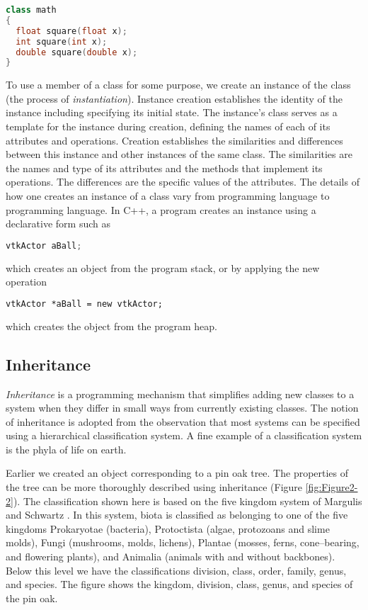 \begin{lstlisting}[language=C++, caption={math class.}]
class math
{
  float square(float x);
  int square(int x);
  double square(double x);
}
\end{lstlisting}

To use a member of a class for some purpose, we create an instance of the class (the process of \emph{instantiation}). Instance creation establishes the identity of the instance including specifying its initial state. The instance's class serves as a template for the instance during creation, defining the names of each of its attributes and operations. Creation establishes the similarities and differences between this instance and other instances of the same class. The similarities are the names and type of its attributes and the methods that implement its operations. The differences are the specific values of the attributes. The details of how one creates an instance of a class vary from programming language to programming language. In C++, a program creates an instance using a declarative form such as

\begin{lstlisting}[language=C++,  caption={}, numbers=none, frame=none]
vtkActor aBall;
\end{lstlisting}

which creates an object from the program stack, or by applying the new operation

\begin{lstlisting}[language=TCL,  caption={}, numbers=none, frame=none]
vtkActor *aBall = new vtkActor;
\end{lstlisting}

which creates the object from the program heap.

\subsection{Inheritance}
\emph{Inheritance} is a programming mechanism that simplifies adding new classes to a system when they differ in small ways from currently existing classes. The notion of inheritance is adopted from the observation that most systems can be specified using a hierarchical classification system. A fine example of a classification system is the phyla of life on earth.

Earlier we created an object corresponding to a pin oak tree. The properties of the tree can be more thoroughly described using inheritance (Figure \ref{fig:Figure2-2}). The classification shown here is based on the five kingdom system of Margulis and Schwartz \cite{Margulis88}.
In this system, biota is classified as belonging to one of the five kingdoms Prokaryotae (bacteria), Protoctista (algae, protozoans and slime molds), Fungi (mushrooms, molds, lichens), Plantae (mosses, ferns, cone--bearing, and flowering plants), and Animalia (animals with and without backbones). Below this level we have the classifications division, class, order, family, genus, and species. The figure shows the kingdom, division, class, genus, and species of the pin oak.

